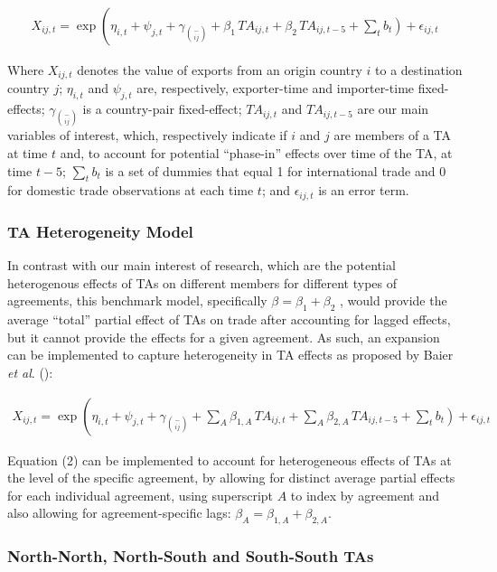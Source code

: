 \begin{multline}
    X_{ij,t} = \exp\left(\eta_{i,t} + \psi_{j,t} + \gamma_{\binom{-}{ij}} + \beta_{1} \, TA_{ij,t} \right. + \beta_{2} \, TA_{ij,t-5} + \left. \sum_{t} b_{t} \right) + \epsilon_{ij,t}
\end{multline}

Where \(X_{ij,t}\) denotes the value of exports from an origin country
\(i\) to a destination country \(j\); \(\eta_{i,t}\) and \(\psi_{j,t}\)
are, respectively, exporter-time and importer-time fixed-effects;
\(\gamma_{\binom{-}{ij}}\) is a country-pair fixed-effect;
\({TA}_{ij,t}\) and \({TA}_{ij,t - 5}\) are our main variables of
interest, which, respectively indicate if \(i\) and \(j\) are members of
a TA at time \(t\) and, to account for potential ``phase-in'' effects
over time of the TA, at time \(t - 5\); \(\sum_{t}^{}b_{t}\) is a set of
dummies that equal 1 for international trade and 0 for domestic trade
observations at each time \(t\); and \(\epsilon_{ij,t}\) is an error
term.
%
\subsubsection{TA Heterogeneity Model}%
\label{ssubsec:TAHeterogeneityModel}%

%
In contrast with our main interest of research, which are the potential
heterogenous effects of TAs on different members for different types of
agreements, this benchmark model, specifically
\(\beta = \beta_{1} + \beta_{2}\) , would provide the average ``total''
partial effect of TAs on trade after accounting for lagged effects, but
it cannot provide the effects for a given agreement. As such, an
expansion can be implemented to capture heterogeneity in TA effects as
proposed by Baier \emph{et al}. (\cite{baier_widely_2019}):

\begin{multline}
    X_{ij,t} = \exp\left(\eta_{i,t} + \psi_{j,t} + \gamma_{\binom{-}{ij}} + \sum_{A} \beta_{1,A} \, TA_{ij,t} \right. + \sum_{A} \beta_{2,A} \, TA_{ij,t-5} + \left. \sum_{t} b_{t} \right) + \epsilon_{ij,t}
\end{multline}

Equation (2) can be implemented to account for heterogeneous effects of
TAs at the level of the specific agreement, by allowing for distinct
average partial effects for each individual agreement, using superscript
\(A\) to index by agreement and also allowing for agreement-specific
lags: \(\beta_{A} = \beta_{1,A} + \beta_{2,A}\).
%
\subsubsection{North{-}North, North{-}South and South{-}South TAs}%
\label{ssubsec:North{-}North,North{-}SouthandSouth{-}SouthTAs}%

